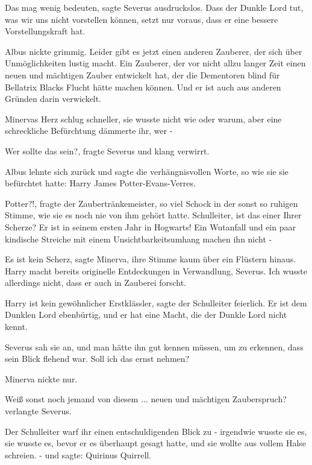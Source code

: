 \glqq{}Das mag wenig bedeuten\grqq{}, sagte Severus ausdruckslos. \glqq{}Dass der
Dunkle Lord tut, was wir uns nicht vorstellen können, setzt nur voraus, dass er
eine bessere Vorstellungskraft hat.\grqq{}

Albus nickte grimmig. \glqq{}Leider gibt es jetzt einen anderen Zauberer, der
sich über Unmöglichkeiten lustig macht. Ein Zauberer, der vor nicht allzu langer
Zeit einen neuen und mächtigen Zauber entwickelt hat, der die Dementoren blind
für Bellatrix Blacks Flucht hätte machen können. Und er ist auch aus anderen
Gründen darin verwickelt.\grqq{}

Minervas Herz schlug schneller, sie wusste nicht wie oder warum, aber eine
schreckliche Befürchtung dämmerte ihr, wer -

\glqq{}Wer sollte das sein?\grqq{}, fragte Severus und klang verwirrt.

Albus lehnte sich zurück und sagte die verhängnisvollen Worte, so wie sie sie
befürchtet hatte: \glqq{}Harry James Potter-Evans-Verres.\grqq{}

\glqq{}Potter?!\grqq{}, fragte der Zaubertränkemeister, so viel Schock in der
sonst so ruhigen Stimme, wie sie es noch nie von ihm gehört hatte. \glqq{}
Schulleiter, ist das einer Ihrer Scherze? Er ist in seinem ersten Jahr in
Hogwarts! Ein Wutanfall und ein paar kindische Streiche mit einem
Unsichtbarkeitsumhang machen ihn nicht -\grqq{}

\glqq{}Es ist kein Scherz\grqq{}, sagte Minerva, ihre Stimme kaum über ein
Flüstern hinaus. \glqq{}Harry macht bereits originelle Entdeckungen in
Verwandlung, Severus. Ich wusste allerdings nicht, dass er auch in Zauberei
forscht.\grqq{}

\glqq{}Harry ist kein gewöhnlicher Erstklässler\grqq{}, sagte der Schulleiter
feierlich. \glqq{}Er ist dem Dunklen Lord ebenbürtig, und er hat eine Macht, die
der Dunkle Lord nicht kennt.\grqq{}

Severus sah sie an, und man hätte ihn gut kennen müssen, um zu erkennen, dass
sein Blick flehend war. \glqq{}Soll ich das ernst nehmen?\grqq{}

Minerva nickte nur.

\glqq{}Weiß sonst noch jemand von diesem ... neuen und mächtigen
Zauberspruch?\grqq{} verlangte Severus.

Der Schulleiter warf ihr einen entschuldigenden Blick zu - irgendwie wusste sie
es, sie wusste es, bevor er es überhaupt gesagt hatte, und sie wollte aus vollem
Halse schreien. - und sagte: \glqq{}Quirinus Quirrell.\grqq{}

